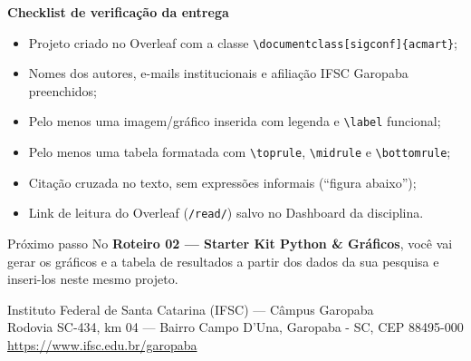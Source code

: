     \begin{tcolorbox}[enhanced, breakable, colback=verdeVivo!5, colframe=verdeVivo!30, boxrule=0.6pt, arc=8pt, left=14pt, right=14pt, top=10pt, bottom=10pt]
        {\color{verde}\bfseries\large\faClipboardCheck\hspace{0.5em}Checklist de verificação da entrega}\par\vspace{4pt}
        \begin{itemize}[label={\caixaMarcar}, itemsep=0.4em]
            \item Projeto criado no Overleaf com a classe \texttt{\textbackslash documentclass[sigconf]\{acmart\}};
            \item Nomes dos autores, e-mails institucionais e afiliação IFSC Garopaba preenchidos;
            \item Pelo menos uma imagem/gráfico inserida com legenda e \texttt{\textbackslash label} funcional;
            \item Pelo menos uma tabela formatada com \texttt{\textbackslash toprule}, \texttt{\textbackslash midrule} e \texttt{\textbackslash bottomrule};
            \item Citação cruzada no texto, sem expressões informais (``figura abaixo'');
            \item Link de leitura do Overleaf (\texttt{/read/}) salvo no Dashboard da disciplina.
        \end{itemize}
    \end{tcolorbox}

    \begin{sucesso}{Próximo passo}
        No \textbf{Roteiro 02 --- Starter Kit Python \& Gráficos}, você vai gerar os gráficos e a tabela de resultados a partir dos dados da sua pesquisa e inseri-los neste mesmo projeto.
    \end{sucesso}

    \vfill
    \begin{center}
        \footnotesize\color{suave}
        Instituto Federal de Santa Catarina (IFSC) — Câmpus Garopaba\\
        Rodovia SC-434, km 04 — Bairro Campo D'Una, Garopaba - SC, CEP 88495-000\\
        \url{https://www.ifsc.edu.br/garopaba}
    \end{center}



